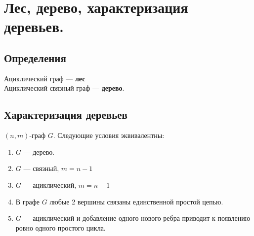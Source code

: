 \documentclass[12pt]{article}
\begin{document}
\section{Лес, дерево, характеризация деревьев.}
\subsection{Определения}
	Ациклический граф — \textbf{лес}\\
	Ациклический связный граф — \textbf{дерево}.
\subsection{Характеризация деревьев}
	$(n,m)$-граф $G$. Следующие условия эквивалентны:
	\begin{enumerate}
		\item $G$ — дерево.
		\item $G$ — связный, $m=n-1$
		\item $G$ — ациклический, $m=n-1$
		\item В графе $G$ любые 2 вершины связаны единственной простой цепью.
		\item $G$ — ациклический и добавление одного нового ребра приводит к появлению ровно одного простого цикла.
	\end{enumerate}
\end{document}
